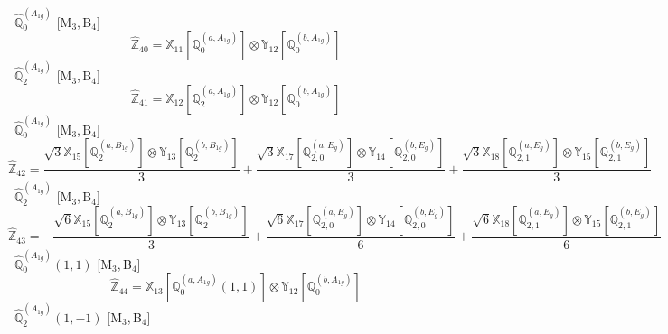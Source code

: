 \documentclass[fleqn,10pt,landscape]{article}
\begin{document}
\begin{itemize}
\begin{dmath*}
\end{dmath*}
\vspace{4mm}
\noindent {} $\,\,\,\hat{\mathbb{Q}}_{0}^{(A_{1g})}$ [M$_{3}$,\,B$_{4}$]
\begin{dmath*}
\hat{\mathbb{Z}}_{40}=\mathbb{X}_{11}[\mathbb{Q}_{0}^{(a,A_{1g})}] \otimes\mathbb{Y}_{12}[\mathbb{Q}_{0}^{(b,A_{1g})}]
\end{dmath*}
\vspace{4mm}
\noindent {} $\,\,\,\hat{\mathbb{Q}}_{2}^{(A_{1g})}$ [M$_{3}$,\,B$_{4}$]
\begin{dmath*}
\hat{\mathbb{Z}}_{41}=\mathbb{X}_{12}[\mathbb{Q}_{2}^{(a,A_{1g})}] \otimes\mathbb{Y}_{12}[\mathbb{Q}_{0}^{(b,A_{1g})}]
\end{dmath*}
\vspace{4mm}
\noindent {} $\,\,\,\hat{\mathbb{Q}}_{0}^{(A_{1g})}$ [M$_{3}$,\,B$_{4}$]
\begin{dmath*}
\hat{\mathbb{Z}}_{42}=\frac{\sqrt{3} \mathbb{X}_{15}[\mathbb{Q}_{2}^{(a,B_{1g})}] \otimes\mathbb{Y}_{13}[\mathbb{Q}_{2}^{(b,B_{1g})}]}{3} + \frac{\sqrt{3} \mathbb{X}_{17}[\mathbb{Q}_{2,0}^{(a,E_{g})}] \otimes\mathbb{Y}_{14}[\mathbb{Q}_{2,0}^{(b,E_{g})}]}{3} + \frac{\sqrt{3} \mathbb{X}_{18}[\mathbb{Q}_{2,1}^{(a,E_{g})}] \otimes\mathbb{Y}_{15}[\mathbb{Q}_{2,1}^{(b,E_{g})}]}{3}
\end{dmath*}
\vspace{4mm}
\noindent {} $\,\,\,\hat{\mathbb{Q}}_{2}^{(A_{1g})}$ [M$_{3}$,\,B$_{4}$]
\begin{dmath*}
\hat{\mathbb{Z}}_{43}=- \frac{\sqrt{6} \mathbb{X}_{15}[\mathbb{Q}_{2}^{(a,B_{1g})}] \otimes\mathbb{Y}_{13}[\mathbb{Q}_{2}^{(b,B_{1g})}]}{3} + \frac{\sqrt{6} \mathbb{X}_{17}[\mathbb{Q}_{2,0}^{(a,E_{g})}] \otimes\mathbb{Y}_{14}[\mathbb{Q}_{2,0}^{(b,E_{g})}]}{6} + \frac{\sqrt{6} \mathbb{X}_{18}[\mathbb{Q}_{2,1}^{(a,E_{g})}] \otimes\mathbb{Y}_{15}[\mathbb{Q}_{2,1}^{(b,E_{g})}]}{6}
\end{dmath*}
\vspace{4mm}
\noindent {} $\,\,\,\hat{\mathbb{Q}}_{0}^{(A_{1g})}(1,1)$ [M$_{3}$,\,B$_{4}$]
\begin{dmath*}
\hat{\mathbb{Z}}_{44}=\mathbb{X}_{13}[\mathbb{Q}_{0}^{(a,A_{1g})}(1,1)] \otimes\mathbb{Y}_{12}[\mathbb{Q}_{0}^{(b,A_{1g})}]
\end{dmath*}
\vspace{4mm}
\noindent {} $\,\,\,\hat{\mathbb{Q}}_{2}^{(A_{1g})}(1,-1)$ [M$_{3}$,\,B$_{4}$]
\begin{dmath*}

\end{dmath*}
\end{itemize}
\end{document}

